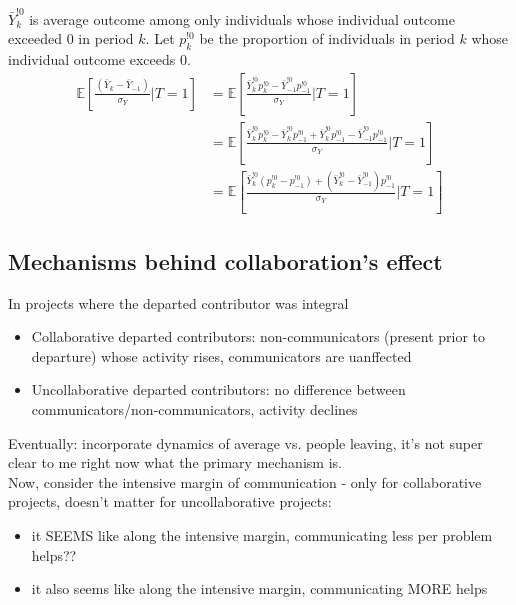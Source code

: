 \documentclass[12pt,notitlepage]{article}
\begin{document}
$\bar Y_{k}^{!0} $ is average outcome among only individuals whose individual outcome exceeded 0 in period $k$. Let $p_k^{!0}$ be the proportion of individuals in period $k$ whose individual outcome exceeds 0. 
\begin{align*}
    \mathbb{E}\!\left[\frac{(\bar Y_k - \bar Y_{-1}) }{\sigma_Y} \Big| T=1\right] &= \mathbb{E}\!\left[\frac{ \bar Y_{k}^{!0}  p_k^{!0} - \bar Y_{-1}^{!0} p_{-1}^{!0} }{\sigma_Y} \Big| T=1\right] \\
    &=  \mathbb{E}\!\left[\frac{ \bar  Y_{k}^{!0}  p_k^{!0} - \bar  Y_{k}^{!0} p_{-1}^{!0} +\bar Y_{k}^{!0}  p_{-1}^{!0}  -\bar Y_{-1}^{!0}  p_{-1}^{!0} }{\sigma_Y} \Big| T=1\right] \\
    &=  \mathbb{E}\!\left[\frac{ \bar  Y_{k}^{!0} \left(p_k^{!0} -  p_{-1}^{!0}  \right) +  \left( \bar  Y_{k}^{!0}  - \bar Y_{-1}^{!0} \right)  p_{-1}^{!0}  }{\sigma_Y} \Big| T=1\right]
\end{align*}



\subsection{Mechanisms behind collaboration's effect}

In projects where the departed contributor was integral
\begin{itemize}
    \item Collaborative departed contributors: non-communicators (present prior to departure) whose activity rises, communicators are uanffected
    \item Uncollaborative departed contributors: no difference between communicators/non-communicators, activity declines
\end{itemize}
Eventually: incorporate dynamics of average vs. people leaving, it's not super clear to me right now what the primary mechanism is. \\
Now, consider the intensive margin of communication - only for collaborative projects, doesn't matter for uncollaborative projects:
\begin{itemize}
    \item it SEEMS like along the intensive margin, communicating less per problem helps??
    \item it also seems like along the intensive margin, communicating MORE helps
\end{itemize}
\end{document}
